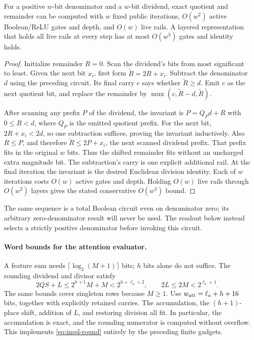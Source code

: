 \begin{lemma}\label{lem:impl-division}
For a positive $w$-bit denominator and a $w$-bit dividend, exact quotient
and remainder can be computed with $w$ fixed public iterations, $O(w^2)$
active Boolean/ReLU gates and depth, and $O(w)$ live rails. A layered
representation that holds all live rails at every step has at most
$O(w^3)$ gates and identity holds.
\end{lemma}
\begin{proof}
Initialize remainder $R=0$. Scan the dividend's bits from most significant
to least. Given the next bit $x_i$, first form $\widetilde R=2R+x_i$.
Subtract the denominator $d$ using the preceding circuit. Its final carry
$c$ says whether $\widetilde R\ge d$. Emit $c$ as the next quotient bit,
and replace the remainder by
$\operatorname{mux}(c,\widetilde R-d,\widetilde R)$.

After scanning any prefix $P$ of the dividend, the invariant is
$P=Q_Pd+R$ with $0\le R<d$, where $Q_P$ is the emitted quotient prefix.
For the next bit, $2R+x_i<2d$, so one subtraction suffices, proving the
invariant inductively. Also $R\le P$, and therefore
$\widetilde R\le2P+x_i$, the next scanned dividend prefix. That prefix
fits in the original $w$ bits. Thus the shifted remainder fits without an
uncharged extra magnitude bit. The subtraction's carry is one explicit
additional rail. At the final iteration the invariant is the desired
Euclidean division identity. Each of $w$ iterations costs $O(w)$ active
gates and depth. Holding $O(w)$ live rails through $O(w^2)$ layers gives
the stated conservative $O(w^3)$ bound.
\end{proof}

The same sequence is a total Boolean circuit even on denominator zero;
its arbitrary zero-denominator result will never be used. The readout
below instead selects a strictly positive denominator before invoking
this circuit.

\paragraph{Word bounds for the attention evaluator.}
A feature sum needs $\lceil\log_2(M+1)\rceil$ bits; $h$ bits alone do not
suffice. The rounding dividend and divisor satisfy
\begin{equation}\label{eq:impl-prefix-wordbounds}
 2QS+L\le 2^{h+1}M+M<2^{h+\ell_a+2},\qquad
 2L\le2M<2^{\ell_a+1}.
\end{equation}
The same bounds cover singleton rows because $M\ge1$. Use
$w_{\rm att}=\ell_a+h+16$ bits, together with explicitly retained carries.
The accumulation, the $(h+1)$-place shift, addition of $L$, and restoring
division all fit. In particular, the accumulation is exact, and the
rounding numerator is computed without overflow. This implements
\eqref{eq:impl-round} entirely by the preceding finite gadgets.

